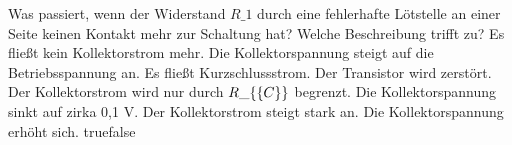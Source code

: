     {Was passiert, wenn der Widerstand $R\_1$ durch eine fehlerhafte Lötstelle an einer Seite keinen Kontakt mehr zur Schaltung hat? Welche Beschreibung trifft zu?}
    {Es fließt kein Kollektorstrom mehr. Die Kollektorspannung steigt auf die Betriebsspannung an.}
    {Es fließt Kurzschlussstrom. Der Transistor wird zerstört.}
    {Der Kollektorstrom wird nur durch $R\_\{\textrm\{C\}\}$ begrenzt. Die Kollektorspannung sinkt auf zirka 0,1 V.}
    {Der Kollektorstrom steigt stark an. Die Kollektorspannung erhöht sich.}
    {true}{false}